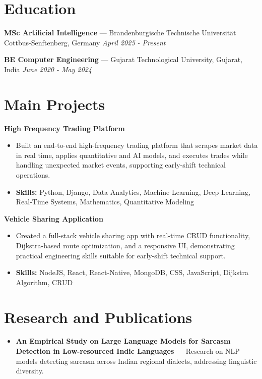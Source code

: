 \documentclass[a4paper,10pt]{article}
\begin{document}
\section*{Education}
\textbf{MSc Artificial Intelligence} — Brandenburgische Technische Universität Cottbus-Senftenberg, Germany \hfill \textit{April 2025 - Present}\par
\vspace{1.5pt}
\textbf{BE Computer Engineering} — Gujarat Technological University, Gujarat, India \hfill \textit{June 2020 - May 2024}\par

\section*{Main Projects}
\textbf{High Frequency Trading Platform}\par
\vspace{1pt}
\begin{itemize}
  \item Built an end-to-end high-frequency trading platform that scrapes market data in real time, applies quantitative and AI models, and executes trades while handling unexpected market events, supporting early-shift technical operations.
  \item \textbf{Skills:} Python, Django, Data Analytics, Machine Learning, Deep Learning, Real-Time Systems, Mathematics, Quantitative Modeling
\end{itemize}
\vspace{3pt}
\textbf{Vehicle Sharing Application}\par
\vspace{1pt}
\begin{itemize}
  \item Created a full-stack vehicle sharing app with real-time CRUD functionality, Dijkstra-based route optimization, and a responsive UI, demonstrating practical engineering skills suitable for early-shift technical support.
  \item \textbf{Skills:} NodeJS, React, React-Native, MongoDB, CSS, JavaScript, Dijkstra Algorithm, CRUD
\end{itemize}

\section*{Research and Publications}
\begin{itemize}
\item \textbf{An Empirical Study on Large Language Models for Sarcasm Detection in Low-resourced Indic Languages} — Research on NLP models detecting sarcasm across Indian regional dialects, addressing linguistic diversity.
\end{itemize}
\end{document}
